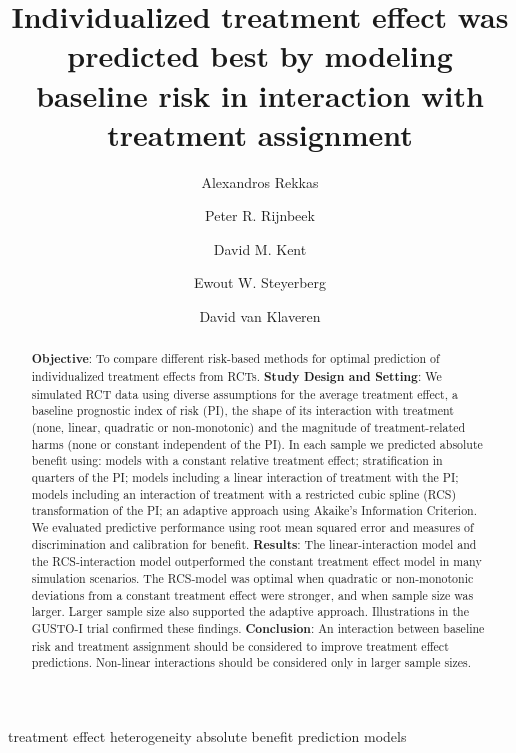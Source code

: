 \documentclass[]{elsarticle} %
\date{}
\begin{document}
\begin{frontmatter}

  \title{Individualized treatment effect was predicted best by modeling
baseline risk in interaction with treatment assignment}
    \author[1]{Alexandros Rekkas}
  
    \author[1]{Peter R. Rijnbeek}
  
    \author[2]{David M. Kent}
  
    \author[3]{Ewout W. Steyerberg}
  
    \author[4]{David van Klaveren}
  
      \address[1]{Department of Medical Informatics, Erasmus Medical
Center, Rotterdam, The Netherlands}
    \address[2]{Predictive Analytics and Comparative Effectiveness
Center, Institute for Clinical Research and Health Policy Studies, Tufts
Medical Center, Boston, Massachusetts, USA}
    \address[3]{Department of Biomedical Data Sciences, Leiden
University Medical Center, Leiden, The Netherlands}
    \address[4]{Department of Public Health, Erasmus Medical Center,
Rotterdam, The Netherlands}
    
  \begin{abstract}
  \textbf{Objective}: To compare different risk-based methods for
  optimal prediction of individualized treatment effects from RCTs.
  \textbf{Study Design and Setting}: We simulated RCT data using diverse
  assumptions for the average treatment effect, a baseline prognostic
  index of risk (PI), the shape of its interaction with treatment (none,
  linear, quadratic or non-monotonic) and the magnitude of
  treatment-related harms (none or constant independent of the PI). In
  each sample we predicted absolute benefit using: models with a
  constant relative treatment effect; stratification in quarters of the
  PI; models including a linear interaction of treatment with the PI;
  models including an interaction of treatment with a restricted cubic
  spline (RCS) transformation of the PI; an adaptive approach using
  Akaike's Information Criterion. We evaluated predictive performance
  using root mean squared error and measures of discrimination and
  calibration for benefit. \textbf{Results}: The linear-interaction
  model and the RCS-interaction model outperformed the constant
  treatment effect model in many simulation scenarios. The RCS-model was
  optimal when quadratic or non-monotonic deviations from a constant
  treatment effect were stronger, and when sample size was larger.
  Larger sample size also supported the adaptive approach. Illustrations
  in the GUSTO-I trial confirmed these findings. \textbf{Conclusion}: An
  interaction between baseline risk and treatment assignment should be
  considered to improve treatment effect predictions. Non-linear
  interactions should be considered only in larger sample sizes.
  \end{abstract}
   \begin{keyword} treatment effect heterogeneity absolute
benefit prediction models\end{keyword}
 \end{frontmatter}
\end{document}
